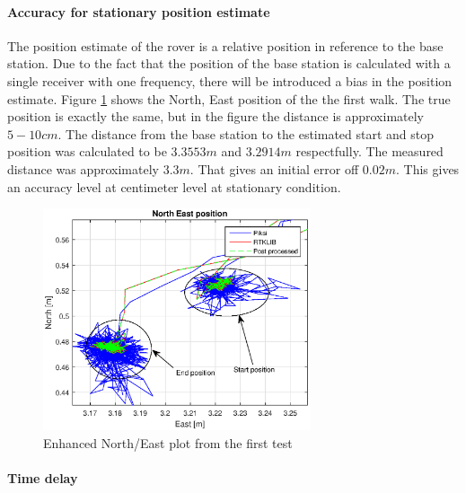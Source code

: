 \paragraph{Accuracy for stationary position estimate}

The position estimate of the rover is a relative position in reference to the base station. Due to the fact that the position of the base station is calculated with a single receiver with one frequency, there will be introduced a bias in the position estimate. Figure \ref{figure:enhancedxywalk1} shows the North, East position of the the first walk. The true position is exactly the same, but in the figure the distance is approximately $5-10cm$. The distance from the base station to the estimated start and stop position was calculated to be $3.3553m$ and $3.2914m$ respectfully. The measured distance was approximately $3.3m$. That gives an initial error off $0.02m$. This gives an accuracy level at centimeter level at stationary condition. 
\begin{figure}[H]
	\centering
		\includegraphics[width=0.7\textwidth]{figs/plots/enhancedxywalk1.eps}
		\caption{Enhanced North/East plot from the first test}
		\label{figure:enhancedxywalk1}
\end{figure}
\paragraph{Time delay}

